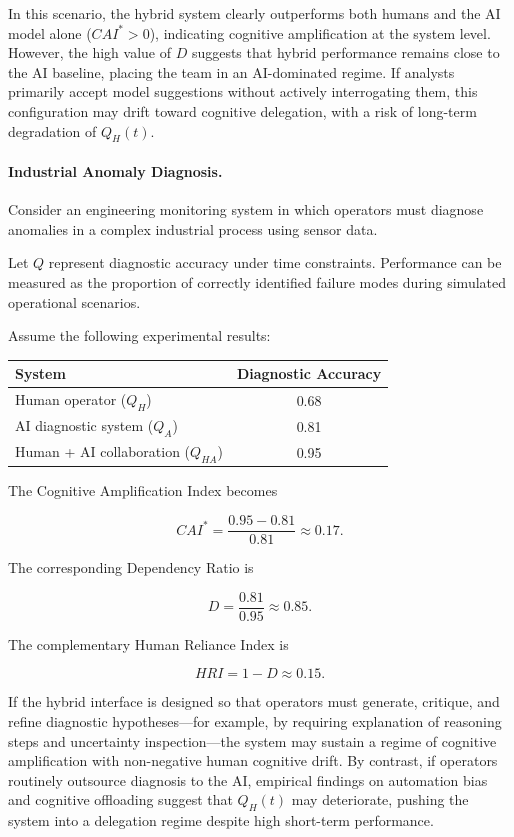 \documentclass[11pt]{article}
\begin{document}
In this scenario, the hybrid system clearly outperforms both humans
and the AI model alone ($CAI^* > 0$), indicating cognitive amplification
at the system level.
However, the high value of $D$ suggests that hybrid performance remains
close to the AI baseline, placing the team in an AI-dominated regime.
If analysts primarily accept model suggestions without actively
interrogating them, this configuration may drift toward cognitive
delegation, with a risk of long-term degradation of $Q_H(t)$.\cite{impact-ai-cognition,humans-inherit-ai-bias}

\paragraph{Industrial Anomaly Diagnosis.}
Consider an engineering monitoring system in which operators must diagnose
anomalies in a complex industrial process using sensor data.

Let $Q$ represent diagnostic accuracy under time constraints.
Performance can be measured as the proportion of correctly identified
failure modes during simulated operational scenarios.

Assume the following experimental results:

\begin{center}
\begin{tabular}{lc}
\toprule
System & Diagnostic Accuracy \\
\midrule
Human operator ($Q_H$) & 0.68 \\
AI diagnostic system ($Q_A$) & 0.81 \\
Human + AI collaboration ($Q_{HA}$) & 0.95 \\
\bottomrule
\end{tabular}
\end{center}

The Cognitive Amplification Index becomes

\[
CAI^* = \frac{0.95 - 0.81}{0.81} \approx 0.17.
\]

The corresponding Dependency Ratio is

\[
D = \frac{0.81}{0.95} \approx 0.85.
\]

The complementary Human Reliance Index is

\[
HRI = 1 - D \approx 0.15.
\]

If the hybrid interface is designed so that operators must
generate, critique, and refine diagnostic hypotheses---for example,
by requiring explanation of reasoning steps and uncertainty inspection---the
system may sustain a regime of cognitive amplification with
non-negative human cognitive drift.
By contrast, if operators routinely outsource diagnosis to the AI,
empirical findings on automation bias and cognitive offloading suggest
that $Q_H(t)$ may deteriorate, pushing the system into a delegation
regime despite high short-term performance.\cite{automation-bias,cognitive-offloading,impact-ai-cognition}
\end{document}
